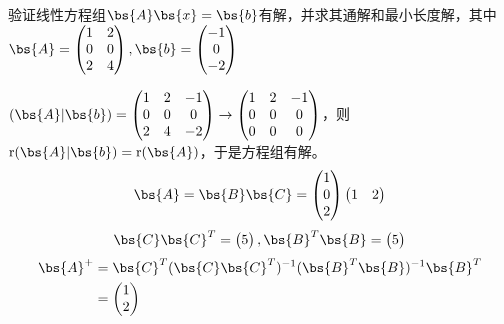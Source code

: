 \documentclass[12pt, a4paper, oneside, UTF8]{ctexbook}
\begin{document}
\begin{question}
    验证线性方程组$\bs{A}\bs{x}=\bs{b}$有解，并求其通解和最小长度解，其中$\bs{A}=\begin{pmatrix}
        1&2\\
        0&0\\
        2&4
    \end{pmatrix},\bs{b}=\begin{pmatrix}
        -1\\
        0\\
        -2
    \end{pmatrix}$
\end{question}

\begin{solution}
    $(\bs{A}|\bs{b})=\begin{pmatrix}
        1&2&-1\\
        0&0&0\\
        2&4&-2
    \end{pmatrix} \rightarrow \begin{pmatrix}
        1&2&-1\\
        0&0&0\\
        0&0&0
    \end{pmatrix}$，则$\mathrm{r}(\bs{A}|\bs{b})=\mathrm{r}(\bs{A})$，于是方程组有解。
    \begin{align*}
        \bs{A}=\bs{B}\bs{C}=\begin{pmatrix}
            1\\
            0\\
            2
        \end{pmatrix}\begin{pmatrix}
            1&2
        \end{pmatrix}
    \end{align*}
    \begin{align*}
        \bs{C}\bs{C}^T=\begin{pmatrix}
            5
        \end{pmatrix},\bs{B}^T\bs{B}=\begin{pmatrix}
            5
        \end{pmatrix}
    \end{align*}
    \begin{align*}
        \bs{A}^+&=\bs{C}^T(\bs{C}\bs{C}^T)^{-1}(\bs{B}^T\bs{B})^{-1}\bs{B}^T\\
        &=\begin{pmatrix}
            1\\
            2

\end{pmatrix}
\end{align*}
\end{solution}
\end{document}
